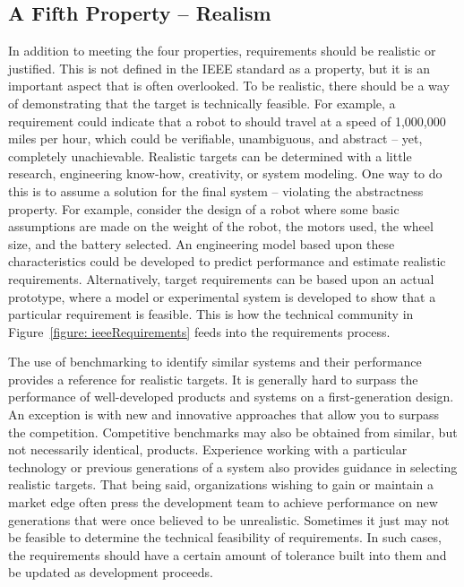 \subsection{A Fifth Property -- Realism}
\label{section:a-fifth-property-realism}

In addition to meeting the four properties, requirements should be
realistic or justified. This is not defined in the IEEE standard as a
property, but it is an important aspect that is often overlooked. To be
realistic, there should be a way of demonstrating that the target is
technically feasible. For example, a requirement could indicate that a
robot to should travel at a speed of 1,000,000 miles per hour, which
could be verifiable, unambiguous, and abstract -- yet, completely
unachievable. Realistic targets can be determined with a little
research, engineering know-how, creativity, or system modeling. One way
to do this is to assume a solution for the final system -- violating the
abstractness property. For example, consider the design of a robot where
some basic assumptions are made on the weight of the robot, the motors
used, the wheel size, and the battery selected. An engineering model
based upon these characteristics could be developed to predict
performance and estimate realistic requirements. Alternatively, target
requirements can be based upon an actual prototype, where a model or
experimental system is developed to show that a particular requirement
is feasible. This is how the technical community in 
Figure~\ref{figure: ieeeRequirements}
feeds into the requirements process.

The use of benchmarking to identify similar systems and their
performance provides a reference for realistic targets. It is generally
hard to surpass the performance of well-developed products and systems
on a first-generation design. An exception is with new and innovative
approaches that allow you to surpass the competition. Competitive
benchmarks may also be obtained from similar, but not necessarily
identical, products. Experience working with a particular technology or
previous generations of a system also provides guidance in selecting
realistic targets. That being said, organizations wishing to gain or
maintain a market edge often press the development team to achieve
performance on new generations that were once believed to be
unrealistic. Sometimes it just may not be feasible to determine the
technical feasibility of requirements. In such cases, the requirements
should have a certain amount of tolerance built into them and be updated
as development proceeds.

